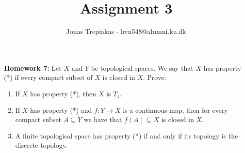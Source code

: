 \documentclass[a4paper]{article}
\title{Assignment 3}
\author{Jonas Trepiakas - hvn548@alumni.ku.dk}
\date{}
\begin{document}
\maketitle
\newpage
    \textbf{Homework 7:} Let $X$ and $Y$ be topological spaces. We say that $X$ 
    has property (*) if every compact subset of $X$ is closed in $X$. Prove:
    \begin{enumerate}[label=(\roman*)]
        \item If $X$ has property (*), then $X$ is $T_1$.
        \item If $X$ has property (*) and $f  \colon Y \to X$ is a continuous
            map, then for every compact subset $A \subseteq Y$ we have that
            $f(A) \subseteq X$ is closed in $X$.
        \item A finite topological space has property (*) if and only if its
            topology is the discrete topology.
    \end{enumerate}
\end{document}
